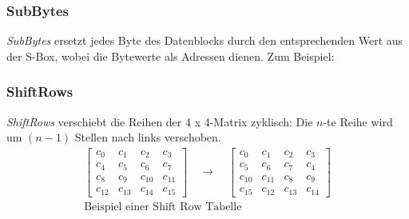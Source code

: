 \subsubsection{SubBytes}
\textit{SubBytes} ersetzt jedes Byte des Datenblocks durch den entsprechenden Wert aus der S-Box, wobei die Bytewerte als Adressen dienen. Zum Beispiel:
\begin{table}[H]
    \caption{Ausschnitt einer S-Box im AES-Algorithmus \\ („X“ ist ein Platzhalter)}
\end{table}



\subsubsection{ShiftRows}
\textit{ShiftRows} verschiebt die Reihen der 4 x 4-Matrix zyklisch: Die $n$-te Reihe wird um $(n-1)$ Stellen nach links verschoben.
\[
\begin{array}{c}
\begin{bmatrix}
c_0  & c_1  & c_2  & c_3  \\
c_4  & c_5  & c_6  & c_7  \\
c_8  & c_9  & c_{10} & c_{11} \\
c_{12} & c_{13} & c_{14} & c_{15}
\end{bmatrix}
\quad\rightarrow\quad
\begin{bmatrix}
c_0  & c_1  & c_2  & c_3  \\
c_5  & c_6  & c_7  & c_4  \\
c_{10} & c_{11} & c_8  & c_9  \\
c_{15} & c_{12} & c_{13} & c_{14}
\end{bmatrix}\\
\text{Beispiel einer Shift Row Tabelle}
\end{array}
\]

